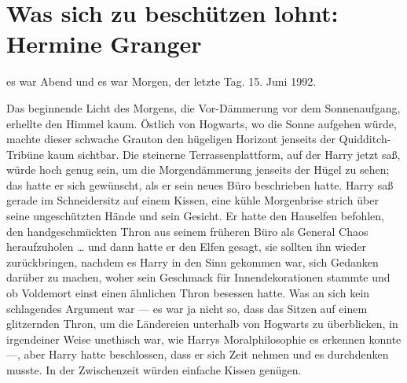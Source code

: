 \chapter{Was sich zu beschützen lohnt: Hermine Granger}

 es war Abend und es war Morgen, der letzte Tag. 15. Juni 1992.

\hplettrineextrapara
Das beginnende Licht des Morgens, die Vor-Dämmerung vor dem Sonnenaufgang, erhellte den Himmel kaum. Östlich von Hogwarts, wo die Sonne aufgehen würde, machte dieser schwache Grauton den hügeligen Horizont jenseits der Quidditch-Tribüne kaum sichtbar.
Die steinerne Terrassenplattform, auf der Harry jetzt saß, würde hoch genug sein, um die Morgendämmerung jenseits der Hügel zu sehen; das hatte er sich gewünscht, als er sein neues Büro beschrieben hatte.
Harry saß gerade im Schneidersitz auf einem Kissen, eine kühle Morgenbrise strich über seine ungeschützten Hände und sein Gesicht. Er hatte den Hauselfen befohlen, den handgeschmückten Thron aus seinem früheren Büro als General Chaos heraufzuholen … und dann hatte er den Elfen gesagt, sie sollten ihn wieder zurückbringen, nachdem es Harry in den Sinn gekommen war, sich Gedanken darüber zu machen, woher sein Geschmack für Innendekorationen stammte und ob Voldemort einst einen ähnlichen Thron besessen hatte. Was an sich kein schlagendes Argument war — es war ja nicht so, dass das Sitzen auf einem glitzernden Thron, um die Ländereien unterhalb von Hogwarts zu überblicken, in irgendeiner Weise unethisch war, wie Harrys Moralphilosophie es erkennen konnte —, aber Harry hatte beschlossen, dass er sich Zeit nehmen und es durchdenken musste. In der Zwischenzeit würden einfache Kissen genügen.

